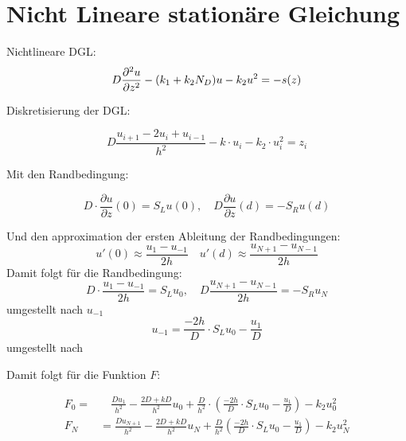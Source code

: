 \chapter{Nicht Lineare stationäre Gleichung}
Nichtlineare DGL:
\begin{equation}
	D\pdv[order={2}]{u}{z}-(k_1+k_2N_D)u-k_2u^2=-s(z)
\end{equation}

Diskretisierung der DGL:

\begin{equation}
	D\frac{u_{i+1}-2u_i+u_{i-1}}{h^2}-k\cdot u_i-k_2 \cdot u_i^2=z_i
\end{equation}

Mit den Randbedingung:

\begin{equation}
	D\cdot \frac{\partial u}{\partial z}(0)=S_Lu(0),\quad D\frac{\partial u}{\partial z}(d)=-S_Ru(d)
\end{equation}

Und den approximation der ersten Ableitung der  Randbedingungen:
\begin{equation}
	u'(0)\approx \frac{u_1-u_{-1}}{2h} \quad u'(d)\approx \frac{u_{N+1}-u_{N-1}}{2h}
\end{equation}
Damit folgt für die Randbedingung:
\begin{equation}
	D\cdot \frac{u_1-u_{-1}}{2h}=S_Lu_0,\quad D\frac{u_{N+1}-u_{N-1}}{2h}=-S_Ru_N
\end{equation}
umgestellt nach $u_{-1}$
 \begin{equation}
	u_{-1}=\frac{-2h}{D}\cdot S_Lu_0-\frac{u_1}{D}
\end{equation}
umgestellt nach 



Damit folgt für die Funktion $F$:

\begin{align}
	F_0= &\quad \frac{Du_1}{h^2}-\frac{2D+kD}{h^2}u_0+\frac{D}{h^2}\cdot\left( \frac{-2h}{D}\cdot S_Lu_0-\frac{u_1}{D}\right) -k_2u_0^2\\
	F_N &= \frac{Du_{N+1}}{h^2}-\frac{2D+kD}{h^2}u_N+\frac{D}{h^2}\left( \frac{-2h}{D}\cdot S_Lu_0-\frac{u_1}{D}\right) -k_2u^2_N
\end{align}


